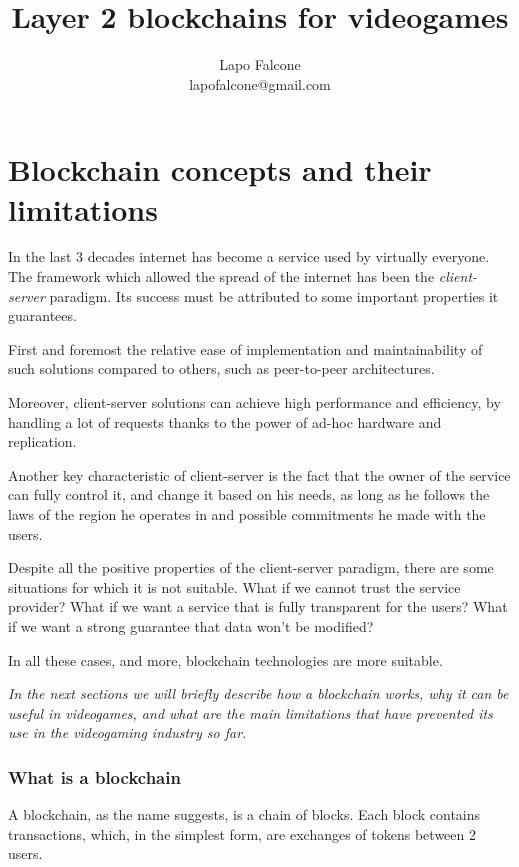 \documentclass[12pt]{article}
\title{Layer 2 blockchains for videogames}
\author{Lapo Falcone \\ lapofalcone@gmail.com}
\begin{document}
\maketitle
\tableofcontents

\newpage

\part{Blockchain concepts and their limitations} \label{part:bcatl}
In the last 3 decades internet has become a service used by virtually everyone. The framework which allowed the spread of the internet has been the \textit{client-server} paradigm.
Its success must be attributed to some important properties it guarantees. 

First and foremost the relative ease of implementation and maintainability of such solutions compared to others, such as peer-to-peer architectures.

Moreover, client-server solutions can achieve high performance and efficiency, by handling a lot of requests thanks to the power of ad-hoc hardware and replication. 

Another key characteristic of client-server is the fact that the owner of the service can fully control it, and change it based on his needs, as long as he follows the laws of the region he operates in and possible commitments he made with the users.

Despite all the positive properties of the client-server paradigm, there are some situations for which it is not suitable. 
What if we cannot trust the service provider? What if we want a service that is fully transparent for the users? What if we want a strong guarantee that data won't be modified?

In all these cases, and more, blockchain technologies are more suitable.

\emph{In the next sections we will briefly describe how a blockchain works, why it can be useful in videogames, and what are the main limitations that have prevented its use in the videogaming industry so far.}

\section {What is a blockchain} \label{section:wiab}
A blockchain, as the name suggests, is a chain of blocks. Each block contains transactions, which, in the simplest form, are exchanges of tokens between 2 users.
\end{document}
